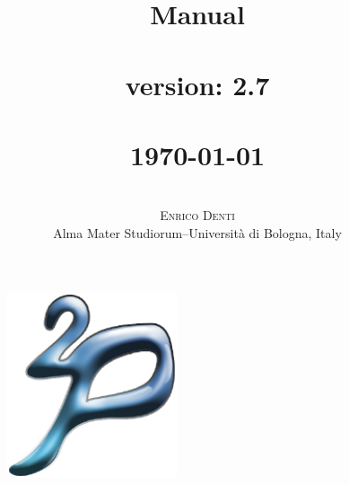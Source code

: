 \documentclass[11pt]{report}
\title{{\Huge{\bf{\tuprolog{} Manual\\\mbox{ }\\}}}
        \tuprolog{} version: 2.7\\\mbox{ }\\
{\small\today\\}
}
\author{ \mbox{ }\\ \textsc{Enrico Denti}\\Alma Mater Studiorum--Universit\`{a} di Bologna, Italy
}
\date{}
\newcommand\logo{
    \begin{figure}[tp]
        \begin{center}
            \includegraphics[width=5cm]{images/logo}
        \end{center}
\end{figure}
}
\begin{document}
\logo

\maketitle

\tableofcontents












\end{document}

